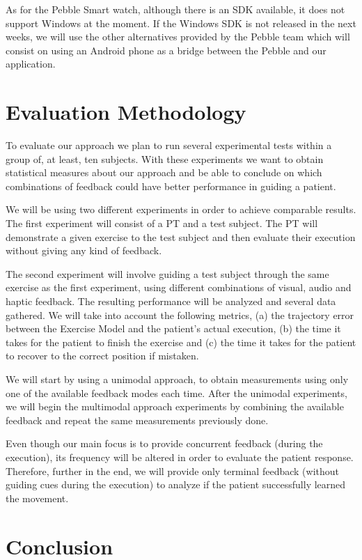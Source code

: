 \documentclass[runningheads]{llncs}
\begin{document}
As for the Pebble Smart watch, although there is an SDK available, it does not support Windows at the moment. If the Windows SDK is not released in the next weeks, we will use the other alternatives provided by the Pebble team which will consist on using an Android phone as a bridge between the Pebble and our application.

\section{Evaluation Methodology}
\label{section-evaluation}

To evaluate our approach we plan to run several experimental tests within a group of, at least, ten subjects. 
With these experiments we want to obtain statistical measures about our approach and be able to conclude 
on which combinations of feedback could have better performance in guiding a patient.

We will be using two different experiments in order to achieve comparable results. 
The first experiment will consist of a \ac{PT} and a test subject. 
The \ac{PT} will demonstrate a given exercise to the test subject and then evaluate their execution without giving any kind of feedback. 

The second experiment will involve guiding a test subject through the same exercise as the first experiment, 
using different combinations of visual, audio and haptic feedback.
The resulting performance will be analyzed and several data gathered. 
We will take into account the following metrics, (a) the trajectory error between the Exercise Model and 
the patient's actual execution, (b) the time it takes for the patient to finish the exercise 
and (c) the time it takes for the patient to recover to the correct position if mistaken.

We will start by using a unimodal approach, to obtain measurements using only one of the 
available feedback modes each time. After the unimodal experiments, we will begin the multimodal 
approach experiments by combining the available feedback and repeat the same measurements previously done.

Even though our main focus is to provide concurrent feedback (during the execution), its frequency will be altered in order to evaluate the patient response. Therefore, further in the end, we will provide only terminal feedback (without guiding cues during the execution) to analyze if the patient successfully learned the movement.
\raggedbottom
\section{Conclusion}
\end{document}
